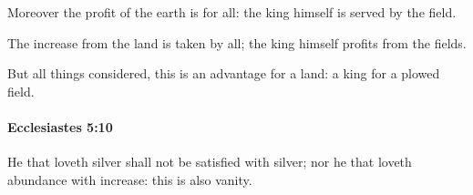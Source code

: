 			\begin{versebox}
					\item[BHS] 
					\item[LXX] 
					\item[ASV] Moreover the profit of the earth is for all: the king himself is served by the field.
					\item[NIV] The increase from the land is taken by all; the king himself profits from the fields.
					\item[NRSV] But all things considered, this is an advantage for a land: a king for a plowed field.
			\end{versebox}

		\paragraph{Ecclesiastes 5:10} %
			\label{ECCLESIASTES-5-10}

			He that loveth silver shall not be satisfied with silver; nor he that loveth abundance with increase: this is also vanity.

